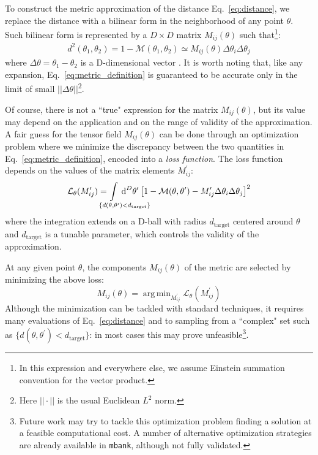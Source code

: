 \documentclass[twocolumn,showpacs,preprintnumbers,nofootinbib,prd,
superscriptaddress,10pt]{revtex4-2}
\newcommand{\dvol}[2]{\ensuremath{\operatorname{d}^{#2}\!{#1}}}
\DeclareMathOperator*{\argmin}{arg\,min}
\begin{document}
To construct the metric approximation of the distance Eq.~\eqref{eq:distance}, we replace the distance with a bilinear form in the neighborhood of any point $\theta$. Such bilinear form is represented by a $D\times D$ matrix $M_{ij}(\theta)$ such that\footnote{
In this expression and everywhere else, we assume Einstein summation convention for the vector product.}:
\begin{align}\label{eq:metric_definition}
	d^2(\theta_1,\theta_2) = 1 - \mathcal{M}(\theta_1,\theta_2) \simeq M_{ij}(\theta) \Delta\theta_i \Delta\theta_j
\end{align}
where $\Delta\theta = \theta_1-\theta_2$ is a D-dimensional vector \cite{owen_metric}.
It is worth noting that, like any expansion, Eq.~\eqref{eq:metric_definition} is guaranteed to be accurate only in the limit of small $||\Delta\theta||$\footnote{Here $||\cdot||$ is the usual Euclidean $L^2$ norm.}.

Of course, there is not a ``true" expression for the matrix $M_{ij}(\theta)$, but its value may depend on the application and on the range of validity of the approximation.
A fair guess for the tensor field $M_{ij}(\theta)$ can be done through an optimization problem where we minimize the discrepancy between the two quantities in Eq.~\eqref{eq:metric_definition}, encoded into a {\it loss function}.
The loss function depends on the values of the matrix elements $M^\prime_{ij}$:
\begin{equation} \label{eq:loss_function}
	\mathcal{L}_\theta(M^\prime_{ij}) = \hspace{-4em} \int\limits_{\hspace{3em}\{d(\theta,\theta^\prime) < d_\mathrm{target}\}} \hspace{-3.8em}
		\dvol{\theta^\prime}{D}  \left[ 1 - \mathcal{M}(\theta,\theta^\prime) - M^\prime_{ij} \Delta\theta_i \Delta\theta_j \right]^2
\end{equation}
where the integration extends on a D-ball with radius $d_\mathrm{target}$ centered around $\theta$ and $d_\mathrm{target}$ is a tunable parameter, which controls the validity of the approximation.

At any given point $\theta$, the components $M_{ij}(\theta)$ of the metric are selected by minimizing the above loss:
\begin{equation} \label{eq:metric_optmization}
	M_{ij}(\theta) = \argmin_{M^\prime_{ij}}  \mathcal{L}_\theta(M^\prime_{ij})
\end{equation}
Although the minimization can be tackled with standard techniques, it requires many evaluations of Eq.~\eqref{eq:distance} and to sampling from a ``complex" set such as ${\{d(\theta,\theta^\prime) < d_\mathrm{target}\}}$: in most cases this may prove unfeasible\footnote{
Future work may try to tackle this optimization problem finding a solution at a feasible computational cost. A number of alternative optimization strategies are already available in \texttt{mbank}, although not fully validated.}.
\end{document}
